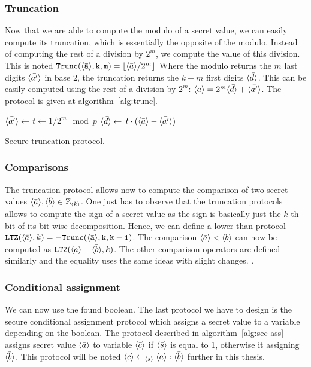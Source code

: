 \subsubsection{Truncation}
Now that we are able to compute the modulo of a secret value, we can easily compute its truncation, which is essentially the opposite of the modulo. Instead of computing the rest of a division by $2^m$, we compute the value of this division. This is noted $\mathtt{Trunc(\langle \bar{a} \rangle,k,m)} = \lfloor \langle \bar{a} \rangle/2^m \rfloor$ Where the modulo returns the $m$ last digits $\langle \bar{a'} \rangle$ in base 2, the truncation returns the $k-m$ first digits $\langle \bar{d} \rangle$. This can be easily computed using the rest of a division by $2^m$: $\langle \bar{a} \rangle = 2^m\langle \bar{d} \rangle + \langle \bar{a'} \rangle$. The protocol is given at algorithm~\ref{alg:trunc}.

\begin{center}
\begin{algorithm}[H]
\DontPrintSemicolon
{}
$\langle \bar{a'} \rangle \leftarrow$  \;
$t \leftarrow 1/2^m \mod p$ \;
$\langle \bar{d} \rangle \leftarrow$ $t \cdot (\langle \bar{a} \rangle-\langle \bar{a'} \rangle)$ \;
\caption{Secure truncation protocol.}
\label{alg:trunc}
\end{algorithm}
\end{center}

\subsubsection{Comparisons}
The truncation protocol allows now to compute the comparison of two secret values $\langle \bar{a} \rangle, \langle \bar{b} \rangle \in \mathbb{Z}_{\langle k \rangle}$. One just has to observe that the truncation protocols allows to compute the sign of a secret value as the sign is basically just the $k$-th bit of its bit-wise decomposition. Hence, we can define a lower-than protocol $\mathtt{LTZ}(\langle \bar{a} \rangle,k) = -\mathtt{Trunc(\langle \bar{a} \rangle,k,k-1)}$. The comparison $\langle \bar{a} \rangle<\langle \bar{b} \rangle$ can now be computed as $\mathtt{LTZ}(\langle \bar{a} \rangle-\langle \bar{b} \rangle,k)$. The other comparison operators are defined similarly and the equality uses the same ideas with slight changes. .

\subsubsection{Conditional assignment}
We can now use the found boolean. The last protocol we have to design is the secure conditional assignment protocol which assigns a secret value to a variable depending on the boolean. The protocol described in algorithm~\ref{alg:sec-ass} assigns secret value $\langle \bar{a} \rangle$ to variable $\langle \bar{c} \rangle$ if $\langle \bar{s} \rangle$ is equal to 1, otherwise it assigning $\langle \bar{b} \rangle$. This protocol will be noted $\langle \bar{c} \rangle \leftarrow_{\langle \bar{s} \rangle} \langle \bar{a} \rangle : \langle \bar{b} \rangle$ further in this thesis.

